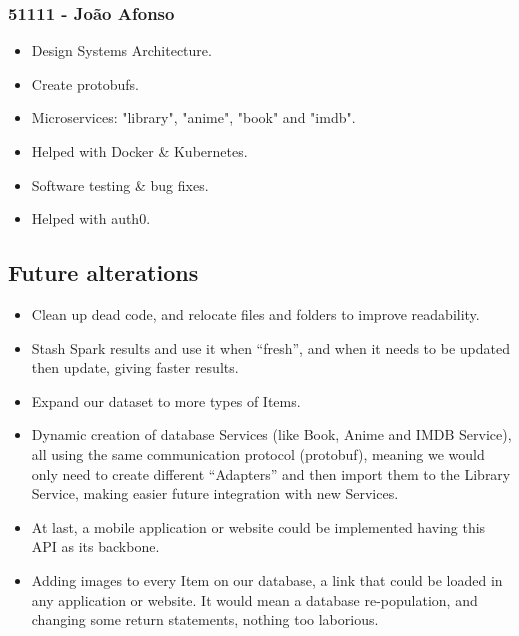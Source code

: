 \documentclass[oneside]{article}
\begin{document}
    \subsubsection{51111 - João Afonso}
        \begin{itemize}
        	\item Design Systems Architecture.
        	\item Create protobufs.
        	\item Microservices: "library", "anime", "book" and "imdb".
        	\item Helped with Docker \& Kubernetes.
       		\item Software testing \& bug fixes.
        	\item Helped with auth0.
      	\end{itemize}

  \subsection{Future alterations}
  \label{sec:alterations}
  \begin{itemize}
    \item Clean up dead code, and relocate files and folders to improve readability.
    \item Stash Spark results and use it when “fresh”, and when it needs to be updated then update, giving faster results.
    \item Expand our dataset to more types of Items.
    \item Dynamic creation of database Services (like Book, Anime and IMDB Service), all using the same communication protocol (protobuf), meaning we would only need to create different “Adapters” and then import them to the Library Service, making easier future integration with new Services.
    \item At last, a mobile application or website could be implemented having this API as its backbone.
    \item Adding images to every Item on our database, a link that could be loaded in any application or website. It would mean a database re-population, and changing some return statements, nothing too laborious.
  \end{itemize}
\end{document}
